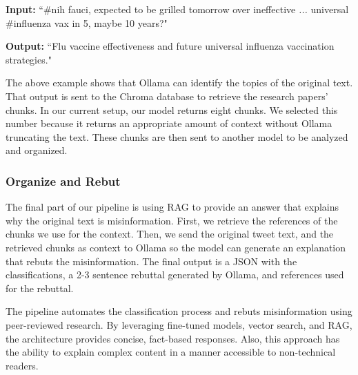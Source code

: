 {\footnotesize %
\begin{tcolorbox}[colback=gray!5,colframe=black!50,boxrule=0.4pt,arc=2pt,left=0.5mm,right=0.5mm,top=0.1mm,bottom=0.1mm,title=Example]
\textbf{Input:}  
``\#nih fauci, expected to be grilled tomorrow over ineffective \textit{...} universal \#influenza vax in 5, maybe 10 years?"

\vspace{0.25em}
\textbf{Output:}  
``Flu vaccine effectiveness and future universal influenza vaccination strategies."
\end{tcolorbox}
}
\indent The above example shows that Ollama can identify the topics of the original text. That output is sent to the Chroma database to retrieve the research papers' chunks. In our current setup, our model returns eight chunks. We selected
this number because it returns an appropriate amount of context without Ollama truncating the text. These chunks are then sent to another model to be analyzed and organized.

\subsubsection{Organize and Rebut}
The final part of our pipeline is using RAG to provide an answer that explains why the original text is misinformation. First, we retrieve the references of the chunks we use for the context. Then, we send the original tweet text, and the retrieved chunks  as context to Ollama so the model can generate an explanation that rebuts the misinformation. The final output is a JSON with the classifications, a 2-3 sentence rebuttal generated by Ollama, and references used for the rebuttal.

The pipeline automates the classification process and rebuts misinformation using peer-reviewed research. By leveraging fine-tuned models, vector search, and RAG, the architecture provides concise, fact-based responses. Also, this
approach has the ability to explain complex content in a manner accessible to non-technical readers. %


